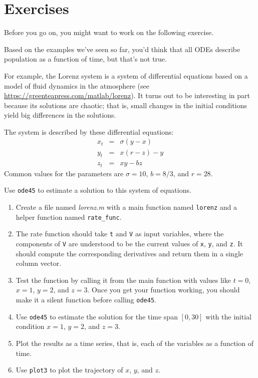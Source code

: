 \section{Exercises}

Before you go on, you might want to work on the following exercise.

\begin{ex}


Based on the examples we've seen so far, you'd think that all ODEs describe population as
a function of time, but that's not true.

For example, the Lorenz system is a system of differential equations based on a model of fluid dynamics in the atmosphere
(see \url{https://greenteapress.com/matlab/lorenz}).
It turns out to be interesting in part because its solutions are chaotic; that is, small changes in the initial conditions yield big differences in the solutions.

The system is described by these differential equations:
%
\begin{eqnarray*}
x_t &=& \sigma (y - x)  \\
y_t &=& x (r - z) - y   \\
z_t &=& xy - b z
\end{eqnarray*}
%
Common values for the parameters are $\sigma = 10$, $b = 8/3$, and $r=28$.

Use \lstinline{ode45} to estimate a solution to this system of equations.

\begin{enumerate}

\item Create a file named \emph{lorenz.m} with a main function named \lstinline{lorenz} and a helper function named \lstinline{rate_func}.

\item  The rate function should
take \lstinline{t} and \lstinline{V} as input variables, where the components
of \lstinline{V} are understood to be the current values of \lstinline{x},
\lstinline{y}, and \lstinline{z}.  It should compute the corresponding derivatives
and return them in a single column vector.

\item Test the function by calling it from the main function with values like $t=0$, $x=1$, $y=2$, and $z=3$.
Once you get your function working, you should make it a silent function before calling \lstinline{ode45}.

\item Use \lstinline{ode45} to estimate the solution for the time span $[0, 30]$
with the initial condition $x=1$, $y=2$, and $z=3$.

\item Plot the results as a time series, that is, each of the variables as a function of time.

\item Use \lstinline{plot3} to plot the trajectory of $x$, $y$, and $z$.

\end{enumerate}


\end{ex}
